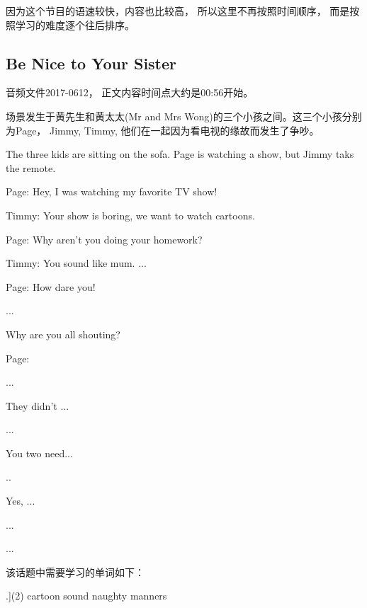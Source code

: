 \documentclass[a4paper]{article}
\begin{document}
因为这个节目的语速较快，内容也比较高， 所以这里不再按照时间顺序， 而是按照学习的难度逐个往后排序。


  \subsection{Be Nice to Your Sister}

音频文件2017-0612， 正文内容时间点大约是00:56开始。

场景发生于黄先生和黄太太(Mr and Mrs Wong)的三个小孩之间。这三个小孩分别为Page， Jimmy, Timmy, 他们在一起因为看电视的缘故而发生了争吵。

The three kids are sitting on the sofa. Page is watching a show, but Jimmy taks the remote.

\begin{multicols}{2}
 {\scriptsize{Page:}{}} Hey, I was watching my favorite TV show!

 {\scriptsize{Timmy:}{}} Your show is boring, we want to watch cartoons.

 {\scriptsize{Page:}{}} Why aren't you doing your homework?

 {\scriptsize{Timmy:}{}} You sound like mum.
...

{\scriptsize{Page:}{}} How dare you!

...

Why are you all shouting?


\end{multicols}

Page:

...


They didn't ...

...


You two need...

..

Yes, ...


...

...


该话题中需要学习的单词如下：

\begin{myWordList}
  \begin{tasks}[counter-format=tsk[1].](2)
    \task cartoon
    \task sound
    \task naughty
    \task manners
  \end{tasks}

\end{myWordList}
\end{document}

